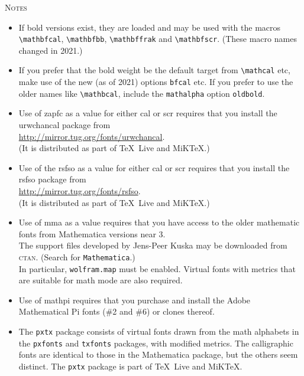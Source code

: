 \documentclass[11pt]{article}
\begin{document}
\textsc{Notes}
\begin{itemize}
\item If bold versions exist, they are loaded and may be used with the macros \verb|\mathbfcal|, \verb|\mathbfbb|, \verb|\mathbffrak| and \verb|\mathbfscr|. (These macro names changed in 2021.)
\item If you prefer that the bold weight be the default target from \verb|\mathcal| etc, make use of the new (as of 2021) options {\tt bfcal} etc. If you prefer to use the older names like \verb|\mathbcal|, include the {\tt mathalpha} option {\tt oldbold}.
\item
Use of \textsf{zapfc} as a value for either \textsf{cal} or \textsf{scr} requires that you install the \textsf{urwchancal} package from\\
 \url{http://mirror.tug.org/fonts/urwchancal}.\\
  (It is distributed as part of \TeX\ Live and MiKTeX.)
\item Use of the \textsf{rsfso} as a value for either \textsf{cal} or \textsf{scr} requires that you install the \textsf{rsfso} package from\\
 \url{http://mirror.tug.org/fonts/rsfso}.\\
 (It is distributed as part of \TeX\ Live and MiKTeX.)
\item Use of \textsf{mma} as a value  requires that you have access to the older mathematic fonts from Mathematica versions near 3.\\
The support files developed by Jens-Peer Kuska may be downloaded from \textsc{ctan}. (Search for {\tt Mathematica}.)\\
In particular, {\tt wolfram.map} must be enabled. Virtual fonts with metrics that are suitable for math mode are also required. 
\item Use of \textsf{mathpi}  requires that you purchase and install the Adobe Mathematical Pi fonts (\#2 and \#6) or  clones thereof.%
\item The {\tt pxtx} package consists of virtual fonts drawn from the math alphabets in the {\tt pxfonts} and {\tt txfonts} packages, with modified metrics. The calligraphic fonts are identical to those in the Mathematica package, but the others seem distinct. The {\tt pxtx} package is part of \TeX\ Live and MiKTeX.

\end{itemize}
\end{document}
